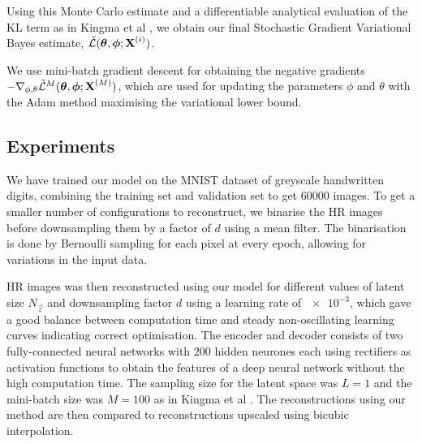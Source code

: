Using this Monte Carlo estimate and a differentiable analytical evaluation of the KL term as in Kingma et al \cite{Kingma2013}, we obtain our final Stochastic Gradient Variational Bayes estimate, $\tilde{\mathcal{L}}(\bm{\mathrm{\theta}},\bm{\mathrm{\phi}};\bm{\mathrm{X}}^{(i)})$.

We use mini-batch gradient descent for obtaining the negative gradients $-\nabla_{\phi,\theta} \tilde{\mathcal{L}}^M(\bm{\mathrm{\theta}},\bm{\mathrm{\phi}};\bm{\mathrm{X}}^{(M)})$, which are used for updating the parameters $\phi$ and $\theta$ with the Adam method \cite{Kingma2014b} maximising the variational lower bound. 



\subsection{Experiments}
\label{sub:experiments}

We have trained our model on the MNIST dataset \cite{MNIST} of greyscale handwritten digits, combining the training set and validation set to get $60000$ images.  
To get a smaller number of configurations to reconstruct, we binarise the HR images before downsampling them by a factor of $d$ using a mean filter.
The binarisation is done by Bernoulli sampling for each pixel at every epoch, allowing for variations in the input data.

HR images was then reconstructed using our model for different values of latent size $N_{\vec{z}}$ and downsampling factor $d$ using a learning rate of $\num{e-3}$, which gave a good balance between computation time and steady non-oscillating learning curves indicating correct optimisation.
The encoder and decoder consists of two fully-connected neural networks with $200$ hidden neurones each using rectifiers as activation functions to obtain the features of a deep neural network without the high computation time.
The sampling size for the latent space was $L = 1$ and the mini-batch size was $M = 100$ as in Kingma et al \cite{Kingma2013}.
The reconstructions using our method are then compared to reconstructions upscaled using bicubic interpolation.
